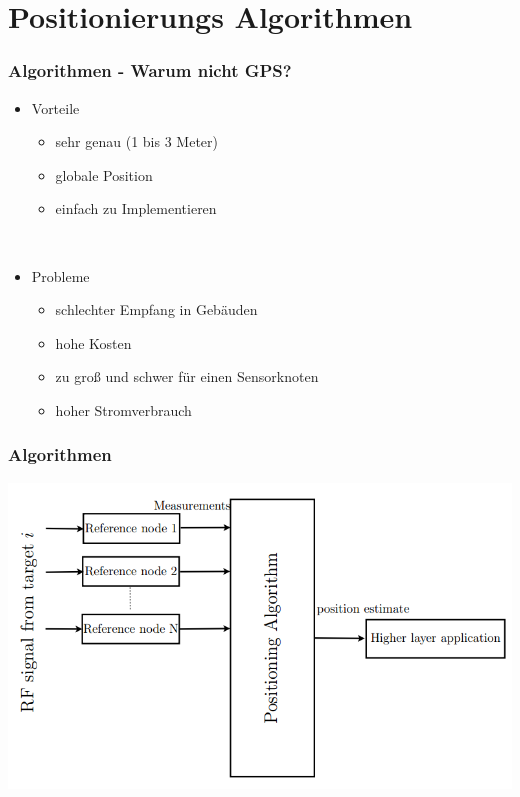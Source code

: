\section{Positionierungs Algorithmen}
\label{sec:algorithmen}

\begin{frame}
  \frametitle{Algorithmen - Warum nicht GPS?}

  \begin{itemize}
  \item Vorteile
    \begin{itemize}
    \item sehr genau (1 bis 3 Meter)
    \item globale Position
    \item einfach zu Implementieren
    \end{itemize}
  ~\\
  \item Probleme
    \begin{itemize}
    \item schlechter Empfang in Gebäuden
    \item hohe Kosten
    \item zu groß und schwer für einen Sensorknoten
    \item hoher Stromverbrauch
    \end{itemize}
  \end{itemize}
\end{frame}

\begin{frame}
  \frametitle{Algorithmen}

  \begin{center}
    \includegraphics[scale=0.35]{img/algo_1}
  \end{center}
\end{frame}

